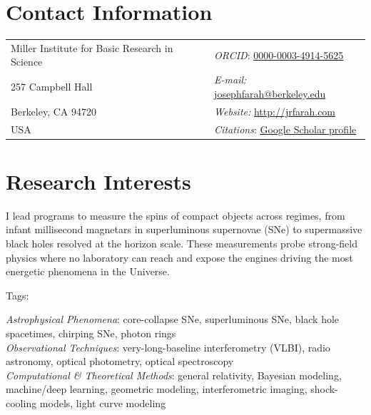 \documentclass[margin,line]{res}
\begin{document}
\begin{resume}

\section{\sc Contact Information}
\vspace{.05in}
\begin{tabular}{@{}p{3in}p{4in}}
Miller Institute for Basic Research in Science & \textit{ORCID}: \href{https://orcid.org/0000-0003-4914-5625}{0000-0003-4914-5625} \\             
257 Campbell Hall & {\it E-mail:} \href{mailto:josephfarah@berkeley.edu}{\color{blue}josephfarah@berkeley.edu}\\
Berkeley, CA 94720  & {\it Website:} \href{http://jrfarah.com}{\color{blue}http://jrfarah.com} \\
USA & \textit{Citations}: \href{https://scholar.google.com/citations?hl=en&user=EVnW70sAAAAJ}{\color{blue}Google Scholar profile}\\
\end{tabular}


\section{\sc Research Interests}

I lead programs to measure the spins of compact objects across regimes, from infant millisecond magnetars in superluminous supernovae (SNe) to supermassive black holes resolved at the horizon scale. These measurements probe strong-field physics where no laboratory can reach and expose the engines driving the most energetic phenomena in the Universe.


{\sc Tags:}\par
\vspace{-0.4cm}
{\leftskip=3mm \noindent
\textit{Astrophysical Phenomena}: core-collapse SNe, superluminous SNe, black hole spacetimes, chirping SNe, photon rings \\
\textit{Observational Techniques}: very-long-baseline interferometry (VLBI), radio astronomy, optical photometry, optical spectroscopy \\
\textit{Computational \& Theoretical Methods}: general relativity, Bayesian modeling, machine/deep learning, geometric modeling, interferometric imaging, shock-cooling models, light curve modeling\par}



\end{resume}
\end{document}
